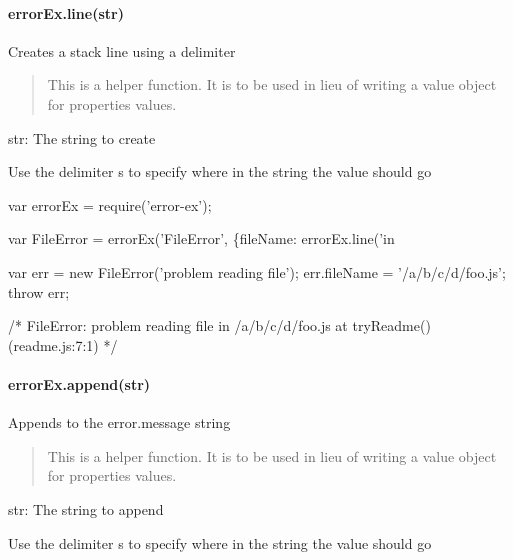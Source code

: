 \paragraph*{{\ttfamily error\+Ex.\+line(str)}}

Creates a stack line using a delimiter

\begin{quote}
This is a helper function. It is to be used in lieu of writing a value object for {\ttfamily properties} values. \end{quote}



\begin{DoxyItemize}
\item {\ttfamily str}\+: The string to create
\begin{DoxyItemize}
\item Use the delimiter {\ttfamily s} to specify where in the string the value should go
\end{DoxyItemize}
\end{DoxyItemize}


\begin{DoxyCode}
var errorEx = require('error-ex');

var FileError = errorEx('FileError', \{fileName: errorEx.line('in %

var err = new FileError('problem reading file');
err.fileName = '/a/b/c/d/foo.js';
throw err;

/*
    FileError: problem reading file
        in /a/b/c/d/foo.js
        at tryReadme() (readme.js:7:1)
*/
\end{DoxyCode}


\paragraph*{{\ttfamily error\+Ex.\+append(str)}}

Appends to the {\ttfamily error.\+message} string

\begin{quote}
This is a helper function. It is to be used in lieu of writing a value object for {\ttfamily properties} values. \end{quote}



\begin{DoxyItemize}
\item {\ttfamily str}\+: The string to append
\begin{DoxyItemize}
\item Use the delimiter {\ttfamily s} to specify where in the string the value should go
\end{DoxyItemize}
\end{DoxyItemize}


